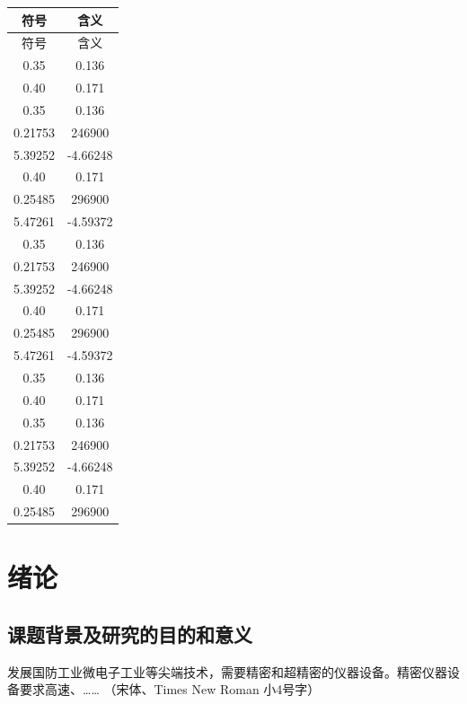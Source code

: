 \documentclass[a4paper, twoside, openany]{NCEPUMaster_Original}
\begin{document}
\begin{longtable}{ C{0.4} C{0.6}}
\toprule[1.5pt]
符号 & 含义 \\  %
\midrule[1pt]
\endfirsthead

\toprule[1.5pt]
符号 & 含义 \\ %
\midrule[1pt]
\endhead

\bottomrule[1.5pt]
\endfoot

0.35 & 0.136 \\  
0.40 & 0.171 \\
0.35 & 0.136 \\
0.21753 & 246900 \\
5.39252 & -4.66248 \\
0.40 & 0.171 \\
0.25485 & 296900 \\
5.47261 & -4.59372 \\
0.35 & 0.136 \\
0.21753 & 246900 \\
5.39252 & -4.66248 \\
0.40 & 0.171 \\ 
0.25485 & 296900 \\
5.47261 & -4.59372 \\
0.35 & 0.136 \\  
0.40 & 0.171 \\
0.35 & 0.136 \\
0.21753 & 246900 \\
5.39252 & -4.66248 \\
0.40 & 0.171 \\
0.25485 & 296900 \\
 
\end{longtable}


\clearpage
\setcounter{page}{1} %

\chapter{绪论} %

\section{课题背景及研究的目的和意义} %

发展国防工业微电子工业等尖端技术，需要精密和超精密的仪器设备。精密仪器设备要求高速、…… （宋体、Times New Roman 小4号字）
\end{document}
